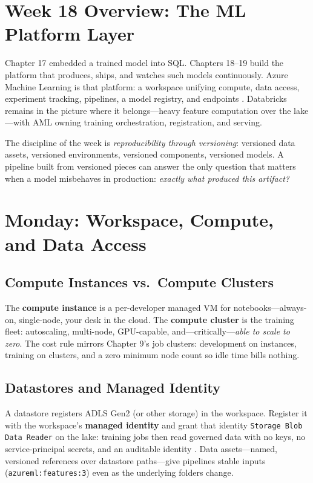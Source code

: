 \section{Week 18 Overview: The ML Platform Layer}
Chapter 17 embedded a trained model into SQL. Chapters 18--19 build the platform that produces, ships, and watches such models continuously. Azure Machine Learning is that platform: a workspace unifying compute, data access, experiment tracking, pipelines, a model registry, and endpoints \cite{microsoft2025azureml}. Databricks remains in the picture where it belongs---heavy feature computation over the lake---with AML owning training orchestration, registration, and serving.

The discipline of the week is \emph{reproducibility through versioning}: versioned data assets, versioned environments, versioned components, versioned models. A pipeline built from versioned pieces can answer the only question that matters when a model misbehaves in production: \emph{exactly what produced this artifact?}

\section{Monday: Workspace, Compute, and Data Access}

\subsection{Compute Instances vs.\ Compute Clusters}
The \textbf{compute instance} is a per-developer managed VM for notebooks---always-on, single-node, your desk in the cloud. The \textbf{compute cluster} is the training fleet: autoscaling, multi-node, GPU-capable, and---critically---\emph{able to scale to zero}. The cost rule mirrors Chapter 9's job clusters: development on instances, training on clusters, and a zero minimum node count so idle time bills nothing.

\subsection{Datastores and Managed Identity}
A datastore registers ADLS Gen2 (or other storage) in the workspace. Register it with the workspace's \textbf{managed identity} and grant that identity \texttt{Storage Blob Data Reader} on the lake: training jobs then read governed data with no keys, no service-principal secrets, and an auditable identity \cite{microsoft2025rbac}. Data assets---named, versioned references over datastore paths---give pipelines stable inputs (\texttt{azureml:features:3}) even as the underlying folders change.

